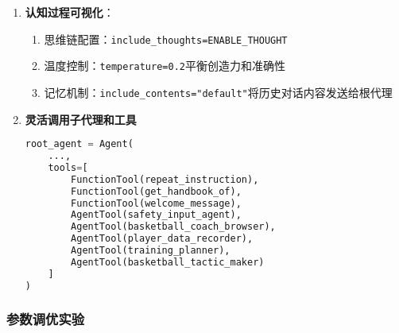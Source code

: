 \documentclass{article}
\theoremstyle{plain}
\theoremstyle{definition}
\theoremstyle{remark}
\begin{document}
\begin{enumerate}
    \item \textbf{认知过程可视化}：
    \begin{enumerate}
        \item 思维链配置：\texttt{include\_thoughts=ENABLE\_THOUGHT}
        \item 温度控制：\texttt{temperature=0.2}平衡创造力和准确性
        \item 记忆机制：\texttt{include\_contents="default"}将历史对话内容发送给根代理
    \end{enumerate}

    \item \textbf{灵活调用子代理和工具}
    \begin{lstlisting}[language=Python]
        root_agent = Agent(
    ...,
    tools=[
        FunctionTool(repeat_instruction),
        FunctionTool(get_handbook_of),
        FunctionTool(welcome_message),
        AgentTool(safety_input_agent),
        AgentTool(basketball_coach_browser),
        AgentTool(player_data_recorder),
        AgentTool(training_planner),
        AgentTool(basketball_tactic_maker)
    ]
) 
    \end{lstlisting}
\end{enumerate}

\subsubsection{参数调优实验}
\end{document}

